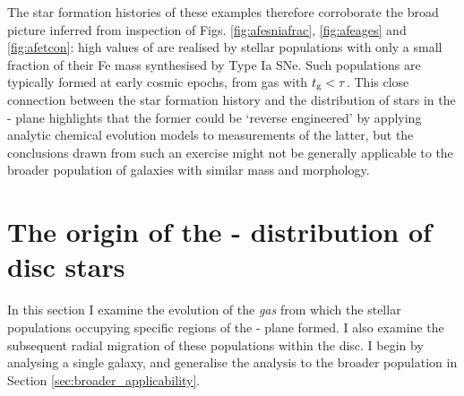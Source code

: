 The star formation histories of these examples therefore corroborate the broad picture inferred from inspection of Figs. \ref{fig:afesniafrac}, \ref{fig:afeages} and \ref{fig:afetcon}: high values of \afe{} are realised by stellar populations with only a small fraction of their Fe mass synthesised by Type Ia SNe. Such populations are typically formed at early cosmic epochs, from gas with $t_{\rm g} < \tau$. This close connection between the star formation history and the distribution of stars in the \afe{}-\feh{} plane highlights that the former could be `reverse engineered' by applying analytic chemical evolution models to measurements of the latter, but the conclusions drawn from such an exercise might not be generally applicable to the broader population of galaxies with similar mass and morphology. 

\section{The origin of the \afe{}-\feh{} distribution of disc stars}
\label{sec:afeorigin}

In this section I examine the evolution of the \emph{gas} from which the stellar populations occupying specific regions of the \afe{}-\feh{} plane formed. I also examine the subsequent radial migration of these populations within the disc. I begin by analysing a single galaxy, and generalise the analysis to the broader population in Section \ref{sec:broader_applicability}.


